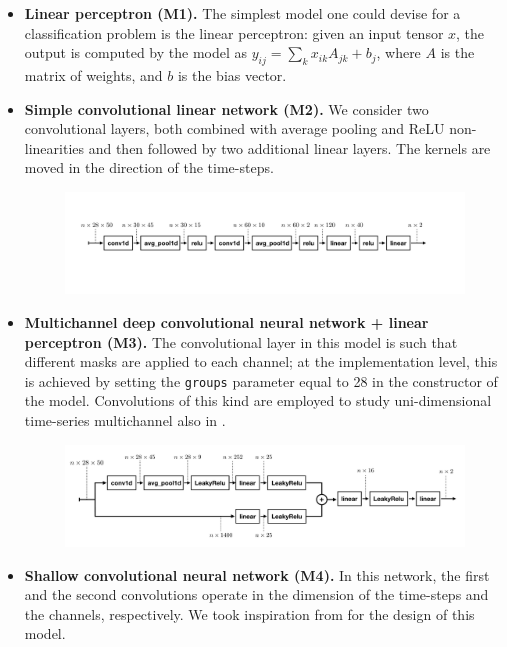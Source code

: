 \documentclass{article}
\begin{document}
\begin{itemize}
\item \textbf{Linear perceptron (M1).} 
The simplest model one could devise for a classification problem is the linear perceptron:  given an input tensor $x$, the output is computed by the model as $y_{ij} = \sum_{k}x_{ik} A_{jk} + b_{j}$, where $A$ is the matrix of weights, and $b$ is the bias vector.

\item \textbf{Simple convolutional linear network (M2).} 
We consider two convolutional layers, both  combined with average pooling and ReLU non-linearities and then followed by two additional linear layers. 
The kernels are moved in the direction of the time-steps.
\begin{figure}[H]
\centering
\includegraphics[width=\textwidth, clip=true,trim=100 300 295 230]{fig/conv1.pdf}
\end{figure}

\item \textbf{Multichannel deep convolutional neural network + linear perceptron (M3).}
The convolutional layer in this model is such that  different masks are applied to each channel; at the implementation level, this is achieved by setting the \verb|groups| parameter equal to 28 in the constructor of the model. Convolutions of this kind are employed to study  uni-dimensional time-series multichannel also in \cite{zheng2014time}.
\begin{figure}[H]
\centering
\includegraphics[width=\textwidth, clip=true,trim=30 40 70 50]{fig/conv2.pdf}
\end{figure}

\item \textbf{Shallow convolutional neural network (M4).}
In this network, the first and the second convolutions operate in the dimension of the time-steps and the channels, respectively. 
We took inspiration from \cite{schirrmeister2017deep} for the design of this model.
\end{itemize}
\end{document}
